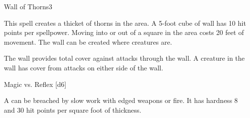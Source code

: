 \begin{spellsection}{Wall of Thorns}{3}
    \begin{spellheader}
    \end{spellheader}
    \begin{spellcontent}
        \begin{spelltargetinginfo}
        \end{spelltargetinginfo}
        \begin{spelleffects}
            \spelleffect This spell creates a thicket of thorns in the area. A 5-foot cube of wall has 10 hit points per spellpower. Moving into or out of a square in the area costs 20 feet of movement. The wall can be created where creatures are.

            The wall provides total cover against attacks through the wall. A creature in the wall has cover from attacks on either side of the wall.
            \spelldur \durshort
        \end{spelleffects}
    \end{spellcontent}
    \begin{spellsubcontent}
        \begin{spelltargetinginfo}
        \end{spelltargetinginfo}
        \begin{spelleffects}
            \begin{spellattack}{Magic vs. Reflex}
                \spellsuccess {}[d6]
            \end{spellattack}
        \end{spelleffects}
    \end{spellsubcontent}
    \begin{spellfooter}
        \spellnotes A  can be breached by slow work with edged weapons or fire. It has hardness 8 and 30 hit points per square foot of thickness.

        \physicalspellnotes
        \miscastexplode
    \end{spellfooter}
\end{spellsection}

